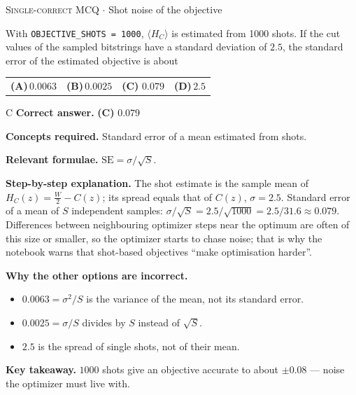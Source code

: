 \documentclass[11pt,a4paper]{article}
\newcommand{\optlabel}[1]{\textbf{(#1)}}
\newcommand{\correctlabel}[1]{\textcolor{okgreen}{\textbf{(#1)}\,\ding{51}}}
\newenvironment{qitem}[1]{\begin{list}{}{\setlength{\leftmargin}{3.3em}\setlength{\labelwidth}{3.1em}%
  \setlength{\labelsep}{0.2em}\setlength{\topsep}{3pt}\setlength{\parsep}{3pt}}\item[\textbf{Q.#1}\hfill]}{\end{list}}
\newcommand{\qsep}{\par\vspace{2pt}{\color{black!15}\hrule}\vspace{4pt}}
\newcommand{\qmeta}[2]{{\footnotesize\color{black!60}\textsc{#1} \;$\cdot$\; #2}\par}
\begin{document}
\begin{qitem}{65}
\qmeta{Single-correct MCQ}{Shot noise of the objective}
With \texttt{OBJECTIVE\_SHOTS = 1000}, $\langle H_C\rangle$ is estimated from 1000 shots. If the cut values of the sampled
bitstrings have a standard deviation of $2.5$, the standard error of the estimated objective is about
\par\smallskip\noindent\begin{tabularx}{\linewidth}{@{}*{4}{L}@{}}
\optlabel{A}\,$0.0063$ & \optlabel{B}\,$0.0025$ & \correctlabel{C}\,$0.079$ & \optlabel{D}\,$2.5$
\end{tabularx}
\end{qitem}
\begin{solbox}{C}
\textbf{\color{brand}Correct answer.} \textcolor{okgreen}{\textbf{(C)}} $0.079$

\textbf{\color{brand}Concepts required.} Standard error of a mean estimated from shots.

\textbf{\color{brand}Relevant formulae.} $\mathrm{SE} = \sigma/\sqrt S$.

\textbf{\color{brand}Step-by-step explanation.} The shot estimate is the sample mean of $H_C(z) = \tfrac W2 - C(z)$; its spread equals that of $C(z)$, $\sigma = 2.5$.
Standard error of a mean of $S$ independent samples: $\sigma/\sqrt S = 2.5/\sqrt{1000} = 2.5/31.6 \approx 0.079$.
Differences between neighbouring optimizer steps near the optimum are often of this size or smaller, so the optimizer starts
to chase noise; that is why the notebook warns that shot-based objectives ``make optimisation harder''.

\textbf{\color{brand}Why the other options are incorrect.}
\begin{itemize}[leftmargin=2.4em, itemsep=1pt, topsep=2pt]
\item[\textbf{(A)}] $0.0063 = \sigma^2/S$ is the variance of the mean, not its standard error.
\item[\textbf{(B)}] $0.0025 = \sigma/S$ divides by $S$ instead of $\sqrt S$.
\item[\textbf{(D)}] $2.5$ is the spread of single shots, not of their mean.
\end{itemize}
\textbf{\color{brand}Key takeaway.} $1000$ shots give an objective accurate to about $\pm0.08$ --- noise the optimizer must live with.
\end{solbox}
\qsep
\end{document}
